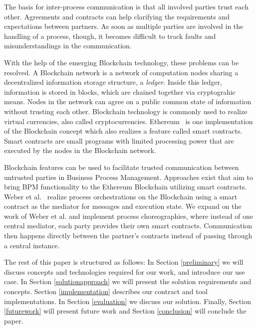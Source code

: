 \documentclass[runningheads]{llncs}
\begin{document}
The basis for inter-process communication is that all involved parties trust each other.
Agreements and contracts can help clarifying the requirements and expectations between partners.
As soon as multiple parties are involved in the handling of a process, though, it becomes difficult to track faults and misunderstandings in the communication.

With the help of the emerging Blockchain technology, these problems can be resolved.
A Blockchain network is a network of computation nodes sharing a decentralized information storage structure, a \emph{ledger}.
Inside this ledger, information is stored in blocks, which are chained together via cryptograhic means.
Nodes in the network can agree on a public common state of information without trusting each other.
Blockchain technology is commonly used to realize virtual currencies, also called cryptocurrencies.
Ethereum~\cite{wood2014ethereum} is one implementation of the Blockchain concept which also realizes a feature called smart contracts.
Smart contracts are small programs with limited processing power that are executed by the nodes in the Blockchain network.

Blockchain features can be used to facilitate trusted communication between untrusted parties in Business Process Management.
Approaches exist that aim to bring BPM functionality to the Ethereum Blockchain utilizing smart contracts.
Weber et al.~\cite{weber2016untrusted} realize process orchestrations on the Blockchain using a smart contract as the mediator for messages and execution state.
We expand on the work of Weber et al. and implement process choreographies, where instead of one central mediator, each party provides their own smart contracts.
Communication then happens directly between the partner's contracts instead of passing through a central instance.

The rest of this paper is structured as follows: In Section \ref{preliminary} we will discuss concepts and technologies required for our work, and introduce our use case.
In Section \ref{solutionapproach} we will present the solution requirements and concepts.
Section \ref{implementation} describes our contract and tool implementations.
In Section \ref{evaluation} we discuss our solution.
Finally, Section \ref{futurework} will present future work and Section \ref{conclusion} will conclude the paper.
\end{document}
